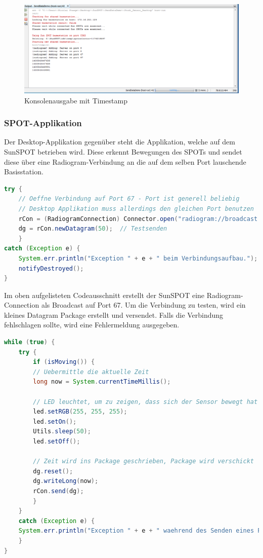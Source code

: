 \begin{figure}[H] 
	\centering
	\includegraphics[scale=0.5]{Bilder/timestamp}
	\caption{Konsolenausgabe mit Timestamp}
	\label{f:timestamp}
\end{figure}

\subsubsection{SPOT-Applikation}\label{sss:SPOT-Applikation}

Der Desktop-Applikation gegenüber steht die Applikation, welche auf dem SunSPOT betrieben wird. Diese erkennt Bewegungen des SPOTs und sendet diese über eine Radiogram-Verbindung an die auf dem selben Port lauschende Basisstation.

\begin{lstlisting}[language=Java,caption={Aufbau der Verbindung auf Port 67},label=lst:spotport,frame=single] 
try {
	// Oeffne Verbindung auf Port 67 - Port ist generell beliebig
	// Desktop Applikation muss allerdings den gleichen Port benutzen
	rCon = (RadiogramConnection) Connector.open("radiogram://broadcast:" + HOST_PORT);
	dg = rCon.newDatagram(50);  // Testsenden
	} 
catch (Exception e) {
	System.err.println("Exception " + e + " beim Verbindungsaufbau.");
	notifyDestroyed();
}
\end{lstlisting}

Im oben aufgelisteten Codeausschnitt erstellt der SunSPOT eine Radiogram-Connection als Broadcast auf Port 67. Um die Verbindung zu testen, wird ein kleines Datagram Package erstellt und versendet. Falls die Verbindung fehlschlagen sollte, wird eine Fehlermeldung ausgegeben.

\begin{lstlisting}[language=Java,caption={Schleife zur Detektion von Bewegung},label=lst:detektion,frame=single] 
while (true) {
	try {
		if (isMoving()) {
		// Uebermittle die aktuelle Zeit
		long now = System.currentTimeMillis();

		// LED leuchtet, um zu zeigen, dass sich der Sensor bewegt hat
		led.setRGB(255, 255, 255);
		led.setOn();
		Utils.sleep(50);
		led.setOff();

		// Zeit wird ins Package geschrieben, Package wird verschickt
		dg.reset();
		dg.writeLong(now);
		rCon.send(dg);
		}
	} 
	catch (Exception e) {
	System.err.println("Exception " + e + " waehrend des Senden eines Paketes.");
	}
}
\end{lstlisting}

